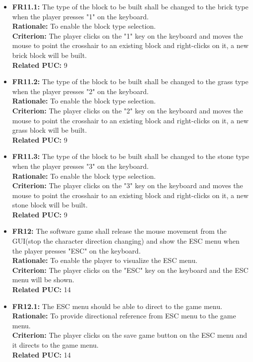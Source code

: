 \documentclass[12pt, titlepage]{article}
\begin{document}
\begin{itemize}
        \item \textbf{FR11.1:} The type of the block to be built shall be changed to the brick type when the player presses "1" on the keyboard.\\
        \textbf{Rationale:} To enable the block type selection.\\
        \textbf{Criterion:} The player clicks on the "1" key on the keyboard and moves the mouse to point the crosshair to an existing block and right-clicks on it, a new brick block will be built.\\
        \textbf{Related PUC:} 9
        
        \item \textbf{FR11.2:} The type of the block to be built shall be changed to the grass type when the player presses "2" on the keyboard.\\
        \textbf{Rationale:} To enable the block type selection.\\
        \textbf{Criterion:} The player clicks on the "2" key on the keyboard and moves the mouse to point the crosshair to an existing block and right-clicks on it, a new grass block will be built.\\
        \textbf{Related PUC:} 9
        
        \item \textbf{FR11.3:} The type of the block to be built shall be changed to the stone type when the player presses "3" on the keyboard.\\
        \textbf{Rationale:} To enable the block type selection.\\
        \textbf{Criterion:} The player clicks on the "3" key on the keyboard and moves the mouse to point the crosshair to an existing block and right-clicks on it, a new stone block will be built.\\
        \textbf{Related PUC:} 9
        
        \item \textbf{FR12:} The software game shall release the mouse movement from the GUI(stop the character direction changing) and show the ESC menu when the player presses "ESC" on the keyboard.\\
        \textbf{Rationale:} To enable the player to visualize the ESC menu.\\
        \textbf{Criterion:} The player clicks on the "ESC" key on the keyboard and the ESC menu will be shown.\\
        \textbf{Related PUC:} 14
        
        
        \item \textbf{FR12.1:} The ESC menu should be able to direct to the game menu.\\
        \textbf{Rationale:} To provide directional reference from ESC menu to the game menu.\\
        \textbf{Criterion:} The player clicks on the save game button on the ESC menu and it directs to the game menu.\\
        \textbf{Related PUC:} 14
        

\end{itemize}
\end{document}
